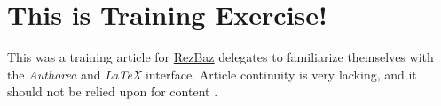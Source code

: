 \section{This is Training Exercise!}
This was a training article for \href{http://melbourne.resbaz.edu.au/}{RezBaz} delegates to familiarize themselves with the \textit{Authorea} and \textit{LaTeX} interface. 
Article continuity is very lacking, and it should not be relied upon for content \cite{Authorea}.